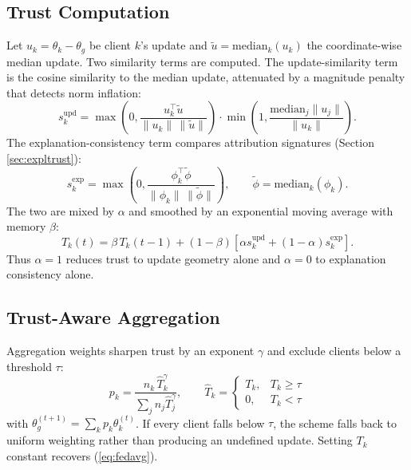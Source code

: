 \documentclass[conference]{IEEEtran}
\begin{document}
\subsection{Trust Computation}
Let $u_k = \theta_k - \theta_g$ be client $k$'s update and
$\tilde{u} = \mathrm{median}_k(u_k)$ the coordinate-wise median update. Two
similarity terms are computed. The update-similarity term is the cosine
similarity to the median update, attenuated by a magnitude penalty that
detects norm inflation:
\begin{equation}
 s^{\mathrm{upd}}_k = \max\!\left(0, \frac{u_k^{\top}\tilde{u}}
 {\lVert u_k\rVert\,\lVert \tilde{u}\rVert}\right)
 \cdot \min\!\left(1, \frac{\mathrm{median}_j \lVert u_j \rVert}
 {\lVert u_k \rVert}\right).
 \label{eq:supd}
\end{equation}
The explanation-consistency term compares attribution signatures (Section
\ref{sec:expltrust}):
\begin{equation}
 s^{\mathrm{exp}}_k = \max\!\left(0, \frac{\phi_k^{\top}\tilde{\phi}}
 {\lVert \phi_k\rVert\,\lVert \tilde{\phi}\rVert}\right),
 \qquad \tilde{\phi} = \mathrm{median}_k(\phi_k).
 \label{eq:sexp}
\end{equation}
The two are mixed by $\alpha$ and smoothed by an exponential moving average
with memory $\beta$:
\begin{equation}
 T_k(t) = \beta\,T_k(t-1) + (1-\beta)\left[\alpha s^{\mathrm{upd}}_k
 + (1-\alpha) s^{\mathrm{exp}}_k\right].
 \label{eq:trust}
\end{equation}
Thus $\alpha=1$ reduces trust to update geometry alone and $\alpha=0$ to
explanation consistency alone.

\subsection{Trust-Aware Aggregation}
Aggregation weights sharpen trust by an exponent $\gamma$ and exclude clients
below a threshold $\tau$:
\begin{equation}
 p_k = \frac{n_k \, \hat{T}_k^{\gamma}}{\sum_{j} n_j \hat{T}_j^{\gamma}},
 \qquad
 \hat{T}_k = \begin{cases} T_k, & T_k \geq \tau\\ 0, & T_k < \tau
 \end{cases}
 \label{eq:weights}
\end{equation}
with $\theta_g^{(t+1)} = \sum_k p_k \theta_k^{(t)}$. If every client falls
below $\tau$, the scheme falls back to uniform weighting rather than
producing an undefined update. Setting $T_k$ constant recovers
(\ref{eq:fedavg}).
\end{document}
